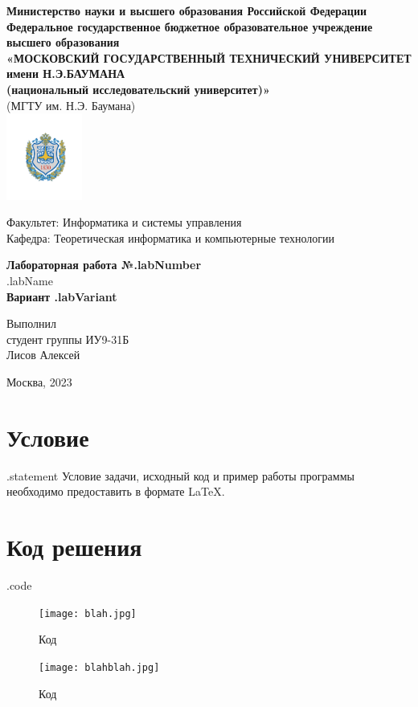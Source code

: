 \documentclass[12pt,a4paper,oneside,titlepage] {article}
\begin{document}
\begin{center}
  \hfill
  \break
  \textbf{
    \footnotesize{Министерство науки и высшего образования Российской Федерации}\\
    \hfill \break
    \footnotesize{Федеральное государственное бюджетное образовательное учреждение высшего образования}\\
    \small{«МОСКОВСКИЙ ГОСУДАРСТВЕННЫЙ ТЕХНИЧЕСКИЙ УНИВЕРСИТЕТ имени Н.Э.БАУМАНА\\(национальный исследовательский университет)»}}\\
    \footnotesize{(МГТУ им. Н.Э. Баумана)}\\
    \includegraphics[width=25mm,scale=0.25]{emblem}
\end{center}
\hfill
\break
\normalsize{Факультет: Информатика и системы управления}\\
\hfill \break
\normalsize{Кафедра: Теоретическая информатика и компьютерные технологии}\\
\hfill\break
\begin{center}
  \textbf{\large{Лабораторная работа №{{.labNumber}}}}\\
  \large{{{.labName}}}\\
  \textbf{\large{Вариант {{.labVariant}}}}\\
\end{center}
\hfill \break
\hfill \break
\hfill \break
\hfill \break
\hfill \break
\hfill \break
\hfill \break
\hfill \break
\begin{flushright}
  \normalsize{
    Выполнил\\
    студент группы ИУ9-31Б\\
    Лисов Алексей
  }
\end{flushright}

\hfill \break
\begin{center} Москва, 2023 \end{center}
\thispagestyle{empty} %

\section{Условие}
{{.statement}} Условие задачи, исходный код и пример работы программы необходимо предоставить в формате \LaTeX.

\section{Код решения}

{{.code}}


\begin{figure}[H]
	\texttt{[image: blah.jpg]}
    \centering
    \caption{Код}
    \label{fig:my_label}
\end{figure}

\begin{figure}[H]
	\texttt{[image: blahblah.jpg]}
    \centering
    \caption{Код}
    \label{fig:my_label}
\end{figure}
\end{document}
